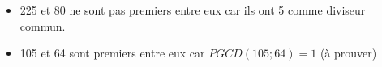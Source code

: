 
\begin{itemize}
\item 225 et 80 ne sont pas premiers entre eux car ils ont 5 comme diviseur commun. 
\item 105 et 64 sont premiers entre eux car $PGCD(105;64)=1$ (à prouver)
\end{itemize}
